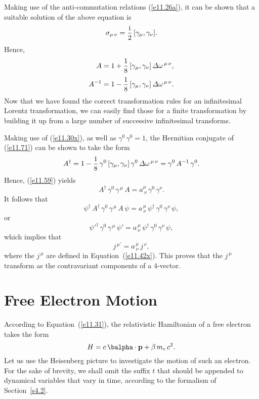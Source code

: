 Making use of the anti-commutation relations (\ref{e11.26a}), it can be shown that a suitable solution of the above
equation is
\begin{equation}\label{e11.70}
\sigma_{\mu\,\nu} = \frac{{\rm i}}{2}\,[\gamma_\mu,\gamma_\nu].
\end{equation}
Hence, 
\begin{align}\label{e11.71}
A &= 1 + \frac{1}{8}\,[\gamma_\mu,\gamma_\nu]\,{\mit\Delta}\omega^{\,\mu\,\nu},\\[0.5ex]
A^{-1} &= 1 - \frac{1}{8}\,[\gamma_\mu,\gamma_\nu]\,{\mit\Delta}\omega^{\,\mu\,\nu}.
\end{align}
Now that we have found the correct transformation rules for an infinitesimal Lorentz transformation, we can easily find those for a
finite transformation by building it up from a large number of successive infinitesimal transforms. 

Making use of (\ref{e11.30x}), as well as $\gamma^0\,\gamma^0=1$,  the Hermitian conjugate of (\ref{e11.71}) can be shown
to take the form
\begin{equation}
A^\dag = 1-\frac{1}{8}\,\gamma^0\,[\gamma_\mu,\gamma_\nu]\,\gamma^0\,{\mit\Delta}\omega^{\,\mu\,\nu} = \gamma^0\,A^{-1}\,\gamma^0.
\end{equation}
Hence, (\ref{e11.59}) yields
\begin{equation}
A^\dag\,\gamma^0\,\gamma^{\,\mu}\,A = a^\mu_{~\nu}\,\gamma^0\,\gamma^\nu.
\end{equation}
It follows that
\begin{equation}
\psi^\dag\,A^\dag\,\gamma^0\,\gamma^{\,\mu}\,A\,\psi= a^{\,\mu}_{~\nu}\,\psi^\dag\,\gamma^0\,\gamma^\nu\,\psi,
\end{equation}
or
\begin{equation}
\psi'^{\dag}\,\gamma^0\,\gamma^{\,\mu}\,\psi'= a^{\,\mu}_{~\nu}\,\psi^\dag\,\gamma^0\,\gamma^\nu\,\psi,
\end{equation}
which implies that
\begin{equation}
j^{\,\mu'} = a^{\,\mu}_{~\nu}\,j^{\,\nu},
\end{equation}
where the $j^{\,\mu}$ are defined in Equation~(\ref{e11.42x}).  This proves that the $j^{\,\mu}$ transform as the contravariant components
of a 4-vector. 

\section{Free Electron Motion}
According to Equation~(\ref{e11.31}), the relativistic Hamiltonian of a free electron takes the form
\begin{equation}
H = c\,\balpha\cdot{\bf p} + \beta\,m_e\,c^2.
\end{equation}
Let us use the Heisenberg picture to investigate the motion of such an electron. For the
sake of brevity, we shall omit the suffix $t$ that should be appended to dynamical variables that vary in time, according to the formalism of Section~\ref{s4.2}.

